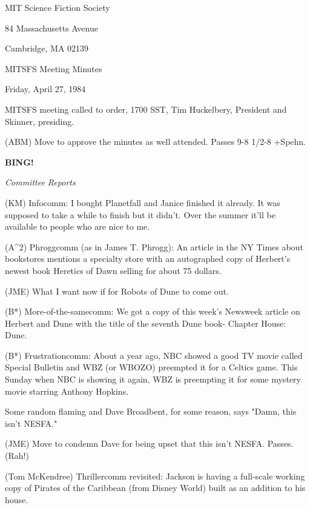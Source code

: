 \documentclass[12pt]{article}
\newcommand{\bing}{{\bf BING!} }
\newcommand{\goto}[1]{\bing \vskip 12pt \centerline{{\em{#1}}}}
\begin{document}
\begin{center}

MIT Science Fiction Society 

84 Massachusetts Avenue

Cambridge, MA 02139

\vspace{12pt}

MITSFS Meeting Minutes 

Friday, April 27, 1984

\end{center}
 
\vspace{18pt}

\setlength{\parskip}{6pt}

\noindent
MITSFS meeting called to order, 1700 SST,
Tim Huckelbery, President and Skinner, presiding.

(ABM) Move to approve the minutes as well attended. Passes 9-8 1/2-8 +Spehn.

\goto{Committee Reports}

(KM) Infocomm: I bought Planetfall and Janice finished it already. It was supposed to take a while to finish but it didn't. Over the summer it'll be available to people who are nice to me.

(A^2) Phroggcomm (as in James T. Phrogg): An article in the NY Times about bookstores mentions a specialty store with an autographed copy of Herbert's newest book Heretics of Dawn selling for about 75 dollars.

(JME) What I want now if for Robots of Dune to come out.

(B*) More-of-the-samecomm: We got a copy of this week's Newsweek article on Herbert and Dune with the title of the seventh Dune book- Chapter House: Dune.

(B*) Frustrationcomm: About a year ago, NBC showed a good TV movie called Special Bulletin and WBZ (or WBOZO) preempted it for a Celtics game. This Sunday when NBC is showing it again, WBZ is preempting it for some mystery movie starring Anthony Hopkins.

Some random flaming and Dave Broadbent, for some reason, says "Damn, this isn't NESFA."

(JME) Move to condemn Dave for being upset that this isn't NESFA. Passes. (Rah!)

(Tom McKendree) Thrillercomm revisited: Jackson is having a full-scale working copy of Pirates of the Caribbean (from Disney World) built as an addition to his house.
\end{document}
